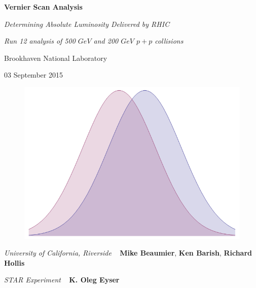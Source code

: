 \renewcommand*\familydefault{\sfdefault}
{\sffamily
\vspace{2cm}

\vspace{1.5cm}


\vspace{0.5cm}
\centerline{\huge \bf{Vernier Scan Analysis}}
\vspace{0.25cm}
\centerline{\emph{Determining Absolute Luminosity Delivered by RHIC}}
\centerline{\emph{Run 12 analysis of 500 $GeV$ and 200 $GeV$ $p+p$ collisions}}

\vfill

\centerline{\Large Brookhaven National Laboratory}

\vspace{0.5cm}

\centerline{\Large 03 September 2015}

\vfill
}

\begin{figure}[H]
  \begin{center}
  \includegraphics[width=0.8\linewidth]{../intro/figs/scan_symbol_no_axes}
  \end{center}
\end{figure}

\vfill

\hspace*{0.2in}\emph {University of California, Riverside} \ 
               \hspace{0.25in} {\bf Mike Beaumier}, {\bf Ken Barish}, {\bf Richard Hollis}

\hspace*{0.2in}\emph {STAR Experiment} \ 
               \hspace{0.25in} {\bf K. Oleg Eyser} \
\renewcommand*\familydefault{\rmdefault}

